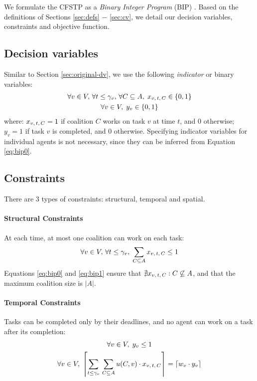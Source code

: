We formulate the CFSTP as a \emph{Binary Integer Program} (BIP) \cite{wolsey2020}. Based
on the definitions of Sections \ref{sec:defs} $-$ \ref{sec:cv}, we detail our decision
variables, constraints and objective function.

\subsection{Decision variables}\label{sec:decvar}

Similar to Section \ref{sec:original-dv}, we use the following \emph{indicator} or binary
variables:
\begin{gather}
    \forall v \in V,\, \forall t \leq \gamma_v,\, \forall C \subseteq A,\;
    x_{v,\, t,\, C} \in \left\{ 0, 1 \right\}\label{eq:bip0}\\
    \forall v \in V,\; y_v \in \left\{ 0, 1 \right\}\label{eq:bip0b}
\end{gather}
where: $x_{v,\, t,\, C} = 1$ if coalition $C$ works on task $v$ at time $t$, and $0$ otherwise; $y_v
= 1$ if task $v$ is completed, and $0$ otherwise. Specifying indicator variables for
individual agents is not necessary, since they can be inferred from Equation
\ref{eq:bip0}.

\subsection{Constraints}\label{sec:bip-constraints}

There are $3$ types of constraints: structural, temporal and spatial.

\paragraph{Structural Constraints}

At each time, at most one coalition can work on each task:
\begin{equation}\label{eq:bip1}
    \forall v \in V,\, \forall t \leq
    \gamma_v,\; \sum_{C \subseteq A} x_{v,\, t,\, C} \leq 1
\end{equation}
Equations \ref{eq:bip0} and \ref{eq:bip1} ensure that $\nexists x_{v,\, t,\, C} : C \not\subseteq A$,
and that the maximum coalition size is $|A|$.

\paragraph{Temporal Constraints}

Tasks can be completed only by their deadlines, and no agent can work on a task after its
completion:
\begin{gather}
    \forall v \in V,\; y_v \leq 1\label{eq:bip2a}\\
    \forall v \in V,\;
    \left\lceil \sum_{t \leq \gamma_v}\, \sum_{C \subseteq A} u(C, v) \cdot x_{v,\, t,\, C}
    \right\rceil = \left\lceil w_v \cdot y_v \right\rceil\label{eq:bip2b}
\end{gather}

